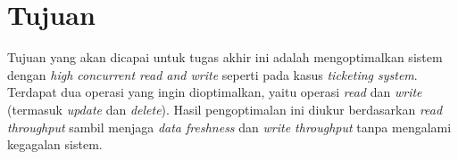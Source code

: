 \section{Tujuan}

Tujuan yang akan dicapai untuk tugas akhir ini adalah mengoptimalkan sistem dengan \textit{high concurrent read and write} seperti pada kasus \textit{ticketing system}. Terdapat dua operasi yang ingin dioptimalkan, yaitu operasi \textit{read} dan \textit{write} (termasuk \textit{update} dan \textit{delete}). Hasil pengoptimalan ini diukur berdasarkan \textit{read throughput} sambil menjaga \textit{data freshness} dan \textit{write throughput} tanpa mengalami kegagalan sistem.